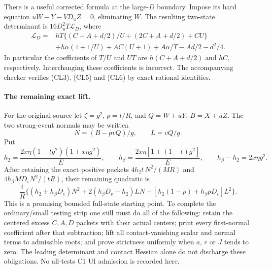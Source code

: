 There is a useful corrected formula at the large-$D$ boundary.
Impose its hard equation $uW-Y-VD_uZ=0$, eliminating $W$.
The resulting two-state determinant is $16D_u^2T\mathcal L_D$, where
\begin{align*}
\mathcal L_D={}&hT\{(C+A+d/2)/U+(2C+A+d/2)+CU\}\\
 &+h\alpha(1+1/U)+AC(U+1)+A\alpha/T-Ad/2-d^2/4.
                                                               \tag{CL6}
\end{align*}
In particular the coefficients of $T/U$ and $UT$ are
$h(C+A+d/2)$ and $hC$, respectively. Interchanging these coefficients
is incorrect. The accompanying checker verifies (CL3), (CL5) and
(CL6) by exact rational identities.

\paragraph{The remaining exact lift.}
For the original source let $\zeta=g^2$, $p=t/R$, and
$Q=W+uY$, $B=X+uZ$. The two strong-event normals may be written
\[
 N=(B-pvQ)/g,\qquad L=vQ/g.
\]
Put
\[
 h_2=\frac{2x\eta(1-tg^2)(1+x\eta g^2)}E,\qquad
 h_\beta=\frac{2x\eta[1+(1-t)g^2]}E,
 \qquad h_\beta-h_2=2x\eta g^2.
\]
After retaining the exact positive packets
$4h_2t\,N^2/(MR)$ and $4h_\beta M D_vN^2/(tR)$, their remaining
quadratic is
\[
 \frac4R\{(h_2+h_\beta D_v)N^2
 +2(h_\beta D_v-h_2)LN
 +[h_2(1-p)+h_\beta pD_v]L^2\}.                    \tag{CL7}
\]
This is a promising bounded full-state starting point. To complete
the ordinary/small testing strip one still must do all of the following:
retain the centered excess $C,A,D$ packets with their actual centers;
print every first-normal coefficient after that subtraction; lift
all contact-vanishing scalar and normal terms to admissible roots;
and prove strictness uniformly when $a$, $r$ or $J$ tends to zero.
The leading determinant and contact Hessian alone do not discharge
these obligations. No all-tests C1 UI admission is recorded here.
